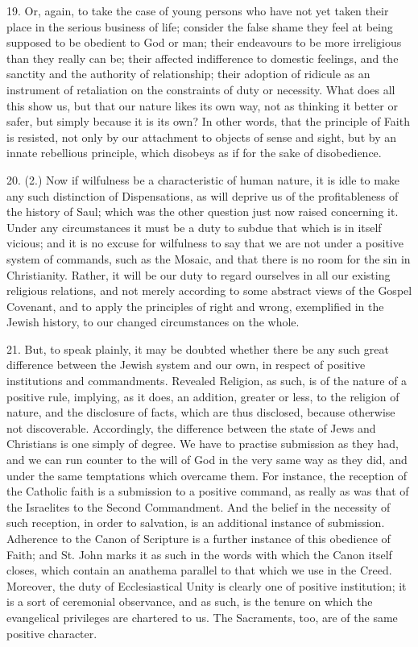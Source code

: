 19. Or, again, to take the case of young persons who have not yet
taken their place in the serious business of life; consider the false
shame they feel at being supposed to be obedient to God or man; their
endeavours to be more irreligious than they really can be; their
affected indifference to domestic feelings, and the sanctity and the
authority of relationship; their adoption of ridicule as an instrument
of retaliation on the constraints of duty or necessity. What does all
this show us, but that our nature likes its own way, not as thinking
it better or safer, but simply because it is its own? In other words,
that the principle of Faith is resisted, not only by our attachment to
objects of sense and sight, but by an innate rebellious principle,
which disobeys as if for the sake of disobedience.

20. (2.) Now if wilfulness be a characteristic of human nature, it
is idle to make any such distinction of Dispensations, as will deprive
us of the profitableness of the history of Saul; which was the other
question just now raised concerning it. Under any circumstances it
must be a duty to subdue that which is in itself vicious; and it is no
excuse for wilfulness to say that we are not under a positive system
of commands, such as the Mosaic, and that there is no room for the sin
in Christianity. Rather, it will be our duty to regard ourselves in
all our existing religious relations, and not merely according to some
abstract views of the Gospel Covenant, and to apply the principles
of
right and wrong, exemplified in the Jewish history, to our changed
circumstances on the whole.

21. But, to speak plainly, it may be doubted whether there be any
such great difference between the Jewish system and our own, in
respect of positive institutions and commandments. Revealed Religion,
as such, is of the nature of a positive rule, implying, as it does, an
addition, greater or less, to the religion of nature, and the
disclosure of facts, which are thus disclosed, because otherwise not
discoverable. Accordingly, the difference between the state of Jews
and Christians is one simply of degree. We have to practise submission
as they had, and we can run counter to the will of God in the very
same way as they did, and under the same temptations which overcame
them. For instance, the reception of the Catholic faith is a
submission to a positive command, as really as was that of the
Israelites to the Second Commandment. And the belief in the necessity
of such reception, in order to salvation, is an additional instance of
submission. Adherence to the Canon of Scripture is a further instance
of this obedience of Faith; and St. John marks it as such in the words
with which the Canon itself closes, which contain an anathema parallel
to that which we use in the Creed. Moreover, the duty of
Ecclesiastical Unity is clearly one of positive institution; it is a
sort of ceremonial observance, and as such, is the tenure on which the
evangelical privileges are chartered to us. The Sacraments, too, are
of the same positive character.

